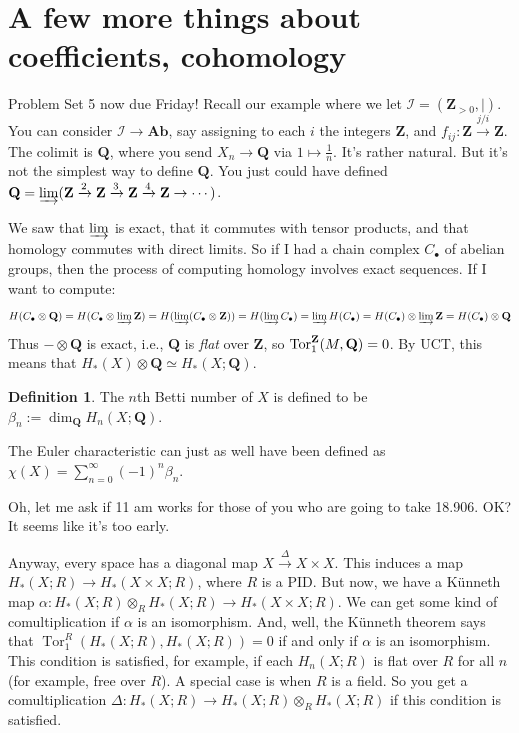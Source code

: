 \documentclass{amsart}
\theoremstyle{theorem}
\theoremstyle{definition}
\newtheorem{definition}[theorem]{Definition}
\DeclareMathOperator{\Tor}{Tor}
\def\cI{\mathscr I}\def\cJ{\mathscr J}\def\cK{\mathscr K}\def\cL{\mathscr L}
\def\QQ{\mathbf Q}\def\RR{\mathbf R}\def\SS{\mathbb S}\def\TT{\mathbb T}
\newcommand{\Z}{\mathbf Z}
\begin{document}
\section{A few more things about coefficients, cohomology}
Problem Set 5 now due Friday! Recall our example where we let $\cI=(\Z_{>0},|)$. You can consider $\cI\to\mathbf{Ab}$, say assigning to each $i$ the integers $\Z$, and $f_{ij}:\Z\xrightarrow{j/i}\Z$. The colimit is $\QQ$, where you send $X_n\to\QQ$ via $1\mapsto \frac{1}{n}$. It's rather natural. But it's not the simplest way to define $\QQ$. You just could have defined $\QQ=\varinjlim(\Z\xrightarrow{2}\Z\xrightarrow{3}\Z\xrightarrow{4}\Z\to\cdots)$.

We saw that $\varinjlim$ is exact, that it commutes with tensor products, and that homology commutes with direct limits. So if I had a chain complex $C_\bullet$ of abelian groups, then the process of computing homology involves exact sequences. If I want to compute:
\begin{equation*}
 H(C_\bullet\otimes\QQ)= H(C_\bullet\otimes\varinjlim \Z)= H(\varinjlim(C_\bullet\otimes\Z))= H(\varinjlim C_\bullet)=\varinjlim H(C_\bullet)= H(C_\bullet)\otimes\varinjlim \Z= H(C_\bullet)\otimes\QQ
\end{equation*}
Thus $-\otimes\QQ$ is exact, i.e., $\QQ$ is \emph{flat} over $\Z$, so $\Tor^\ZZ_1(M,\QQ)=0$. By UCT, this means that $ H_\ast(X)\otimes \QQ\simeq H_\ast(X;\QQ)$.
\begin{definition}
The $n$th Betti number of $X$ is defined to be $\beta_n:=\dim_\QQ H_n(X;\QQ)$.
\end{definition}
The Euler characteristic can just as well have been defined as $\chi(X)=\sum^\infty_{n=0}(-1)^n\beta_n$.

Oh, let me ask if 11 am works for those of you who are going to take 18.906. OK? It seems like it's too early.

Anyway, every space has a diagonal map $X\xrightarrow{\Delta}X\times X$. This induces a map $ H_\ast(X;R)\to H_\ast(X\times X;R)$, where $R$ is a PID. But now, we have a K\"{u}nneth map $\alpha: H_\ast(X;R)\otimes_R H_\ast(X;R)\to H_\ast(X\times X;R)$. We can get some kind of comultiplication if $\alpha$ is an isomorphism. And, well, the K\"{u}nneth theorem says that $\Tor^R_1( H_\ast(X;R), H_\ast(X;R))=0$ if and only if $\alpha$ is an isomorphism. This condition is satisfied, for example, if each $ H_n(X;R)$ is flat over $R$ for all $n$ (for example, free over $R$). A special case is when $R$ is a field. So you get a comultiplication $\Delta: H_\ast(X;R)\to H_\ast(X;R)\otimes_R H_\ast(X;R)$ if this condition is satisfied.
\end{document}
